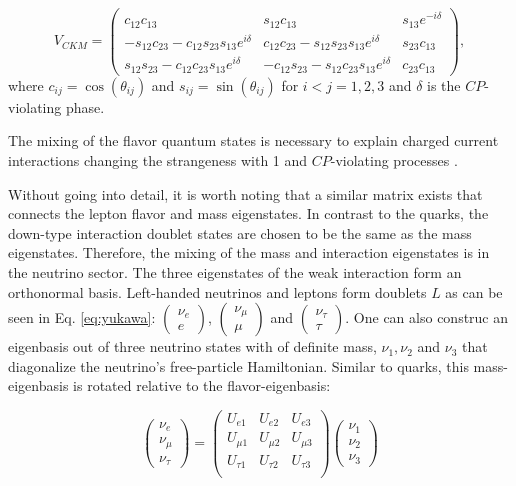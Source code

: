 \begin{equation}
V_{CKM} = \begin{pmatrix}
c_{12}c_{13} & s_{12}c_{13} & s_{13}e^{-i\delta} \\
-s_{12}c_{23} - c_{12}s_{23}s_{13} e^{i\delta} & c_{12}c_{23} - s_{12}s_{23}s_{13}e^{i\delta} & s_{23}c_{13} \\
s_{12}s_{23} - c_{12}c_{23}s_{13}e^{i\delta} 
& -c_{12}s_{23} - s_{12}c_{23}s_{13}e^{i\delta} & c_{23}c_{13}
\end{pmatrix},
\end{equation}
where $c_{ij} = \cos\left(\theta_{ij}\right)$ and  $s_{ij} = \sin\left(\theta_{ij}\right)$ for $i<j = 1,2,3$ and $\delta$ is the $CP$-violating phase.

The mixing of the flavor quantum states is necessary to explain charged current interactions changing the strangeness with 1 \cite{Glashow:1970gm} and $CP$-violating processes \cite{1964PhRvL}.

Without going into detail, it is worth noting that a similar matrix exists that connects the lepton flavor and mass eigenstates. In contrast to the quarks, the down-type interaction doublet states are chosen to be the same as the mass eigenstates. Therefore, the mixing of the mass and interaction eigenstates is in the neutrino sector. The three eigenstates of the weak interaction form an orthonormal basis. Left-handed neutrinos and leptons form doublets $L$ as can be seen in Eq. \ref{eq:yukawa}: $\begin{pmatrix}\nu_e \\ e \end{pmatrix}$, $\begin{pmatrix}\nu_\mu \\ \mu \end{pmatrix}$ and $\begin{pmatrix}\nu_\tau \\ \tau \end{pmatrix}$. One can also construc an eigenbasis out of three neutrino states with of definite mass, $\nu_1, \nu_2$ and $\nu_3$ that diagonalize the neutrino's free-particle Hamiltonian. Similar to quarks, this mass-eigenbasis is rotated relative to the flavor-eigenbasis:

\begin{equation}
\begin{pmatrix}
\nu_e \\ \nu_\mu \\ \nu_\tau
\end{pmatrix}
=
\begin{pmatrix}
U_{e1} & U_{e2} & U_{e3} \\
U_{\mu 1} & U_{\mu 2} & U_{\mu 3} \\
U_{\tau 1} & U_{\tau 2} & U_{\tau 3} \\
\end{pmatrix}
\begin{pmatrix}
\nu_1 \\ \nu_2 \\ \nu_3
\end{pmatrix}
\end{equation}

